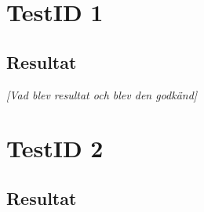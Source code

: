 \documentclass[a4paper,10pt]{article}
\begin{document}
\section{TestID 1}
\subsection{Resultat}
\emph{[Vad blev resultat och blev den godkänd]}
\section{TestID 2}
\subsection{Resultat}
\end{document}
